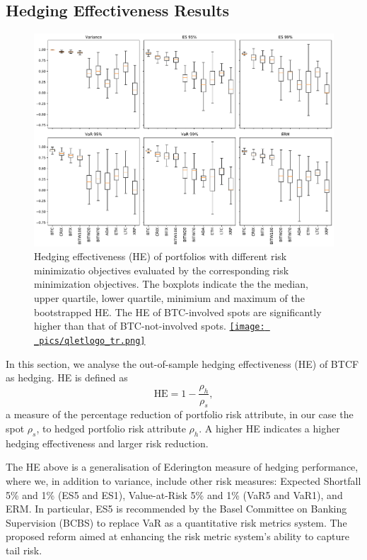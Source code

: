 \subsection{Hedging Effectiveness Results}\label{sec: HE results}
\begin{figure}[t]
\includegraphics[width=\textwidth]{_pics/ES5_HE_boxplot.pdf}
  \caption{Hedging effectiveness (HE) of portfolios with different risk minimizatio objectives evaluated by the corresponding risk minimization objectives.
            The boxplots indicate the the median, upper quartile, lower quartile, minimium and maximum of the bootstrapped HE.
            The HE of BTC-involved spots are significantly higher than that of BTC-not-involved spots.
  \href{http://www.quantlet.com/}{\texttt{[image: \_pics/qletlogo\_tr.png]}} }
\label{fig:HEboxplot}
\end{figure}
In this section, we analyse the out-of-sample hedging effectiveness (HE) of BTCF as hedging.
HE is defined as $$\text{HE} = 1-\frac{\rho_h}{\rho_s},$$
a measure of the percentage reduction of portfolio risk attribute, in our case the spot $\rho_s$,
to hedged portfolio risk attribute $\rho_h$.
A higher HE indicates a higher hedging effectiveness and larger risk reduction. \medskip

The HE above is a generalisation of Ederington measure   of hedging performance, where we,
in addition to variance, include other risk measures: Expected
Shortfall 5\% and 1\% (ES5 and ES1), Value-at-Risk 5\% and 1\% (VaR5
and VaR1), and ERM. 
In particular, ES5 is recommended by the Basel Committee on Banking Supervision (BCBS) to replace VaR as a quantitative risk metrics system.
The proposed reform aimed at enhancing the risk metric system's ability to capture tail risk.  
%

